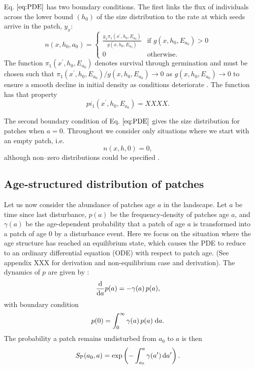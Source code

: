 \documentclass[10pt,twoside]{article}
\begin{document}
Eq. \(\ref{eq:PDE}\) has two boundary conditions. The first links the
flux of individuals across the lower bound \((h_0)\) of the size
distribution to the rate at which seeds arrive in the patch, \(y_x\):
\begin{equation} \label{eq:BC1}
  n(x,h_0,a_0)  = \left\{
  \begin{array}{ll}   \frac{y_x  \pi_1 (x^\prime,h_0, E_{a_0}) }{ g(x,h_0, E_{a_0}) }  & \textrm{if } g(x,h_0, E_{a_0}) > 0 \\
  0 & \textrm{otherwise.}
  \end{array} \right.
\end{equation}
The function \(\pi_1 (x^\prime,h_0, E_{a_0})\) denotes survival through
germination and must be chosen such that
\(\pi_1 (x^\prime,h_0, E_{a_0}) / g(x,h_0, E_{a_0}) \rightarrow 0\) as
\(g(x,h_0, E_{a_0}) \rightarrow 0\) to ensure a smooth decline in
initial density as conditions deteriorate \citep{Falster-2011}. The
function has that property
\begin{equation} \label{eq:pi1}
  pi_1 (x^\prime,h_0, E_{a_0}) = XXXX.
\end{equation}

The second boundary condition of Eq. \(\ref{eq:PDE}\) gives the size
distribution for patches when \(a=0\). Throughout we consider only
situations where we start with an empty patch, i.e.
\begin{equation} \label{eq:BC2} n\left(x,h,0\right) =0,
\end{equation}
although non--zero distributions could be specified
\citep[e.g][]{Moorcroft-2001}.

\subsection{Age-structured distribution of
patches}\label{age-structured-distribution-of-patches}

Let us now consider the abundance of patches age \(a\) in the landscape.
Let \(a\) be time since last disturbance, \(p(a)\) be the
frequency-density of patches age \(a\), and \(\gamma(a)\) be the
age-dependent probability that a patch of age \(a\) is transformed into
a patch of age 0 by a disturbance event. Here we focus on the situation
where the age structure has reached an equilibrium state, which causes
the PDE to reduce to an ordinary differential equation (ODE) with
respect to patch age. (See appendix XXX for derivation and
non-equilibrium case and derivation). The dynamics of \(p\) are given by
\citep{Vonfoerster-1959, Mckendrick-1926}:
\begin{equation} \label{eq:agepde}
\frac{{\rm d}}{{\rm d} a} p(a)  = -\gamma(a) \, p(a) ,
\end{equation}
with boundary condition
\begin{equation}  p(0)  = \int_0^\infty \gamma(a) \, p(a) \; {\rm d} a.
\end{equation}
The probability a patch remains undisturbed from \(a_0\) to \(a\) is
then
\begin{equation} \label{eq:survivalPatch}
  S_{\rm P} (a_0,a) = \exp\left(-\int_{a_0}^{a} \gamma(a^\prime) \, {\rm d} a^\prime \right).
\end{equation}
\end{document}

